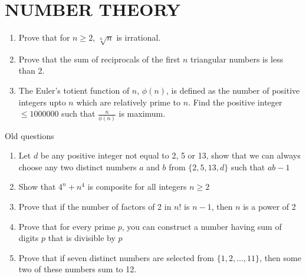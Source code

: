 \documentclass[12pt]{article}
\begin{document}
\section{NUMBER THEORY}
\begin{enumerate}
    \item Prove that for \(n \geq 2\), \(\sqrt[n]{n}\) is irrational.
    \item Prove that the sum of reciprocals of the first \(n\) triangular numbers is less than 2.
    \item The Euler's totient function of $n$, $\phi(n)$, is defined as the number of positive integers upto $n$ which are relatively prime to $n$. Find the positive integer $\leq 1000000$ such that $\frac{n}{\phi(n)}$ is maximum.
\end{enumerate}
    Old questions

\begin{enumerate}
    \item Let $d$ be any positive integer not equal to 2, 5 or 13, show that we can always choose any two distinct numbers $a$ and $b$ from $\{2,5,13,d\}$ such that $ab-1$
    \item Show that $4^{n}+n^{4}$ is composite for all integers $n\ge 2$       
    \item Prove that if the number of factors of 2 in $n!$ is $n-1$, then $n$ is a power of 2
    \item Prove that for every prime $p$, you can construct a number having sum of digits $p$ that is divisible by $p$
    \item Prove that if seven distinct numbers are selected from $\{1, 2,\dots, 11\}$, then some two of these numbers sum to 12.
\end{enumerate}
\end{document}
